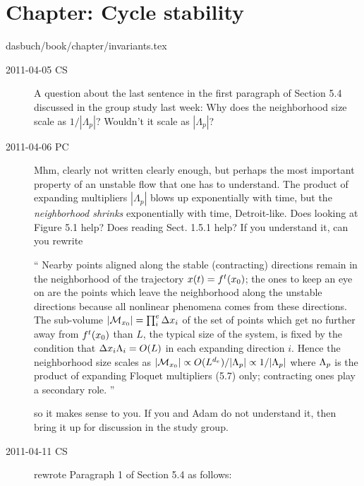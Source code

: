\section{Chapter: Cycle stability}
\label{c-invariants}\noindent dasbuch/book/chapter/invariants.tex
\begin{description}

\item[2011-04-05 CS] A question about the last sentence in the first
paragraph of Section 5.4  discussed in the group study last week: Why
does the neighborhood size scale as $1/|\Lambda_{p}|$? Wouldn't it scale
as $|\Lambda_{p}|$?

\item[2011-04-06 PC] Mhm, clearly not written clearly enough, but perhaps
the most important property of an unstable flow that one has to
understand. The product of expanding multipliers $|\Lambda_{p}|$ blows up
exponentially with time, but the \emph{neighborhood shrinks}
exponentially with time, Detroit-like. Does looking at Figure 5.1 help?
Does reading Sect. 1.5.1 help? If you understand it, can you rewrite

                                                    \toCB
``
Nearby points aligned along the stable (contracting) directions  remain
in the neighborhood of the trajectory $x(t)= {f^{t}({x_0})}$; the
ones to keep an eye on are the points which leave the neighborhood along
the unstable directions because all nonlinear phenomena comes from these
directions. The sub-volume $ |{\cal M}_{{x_0}}| = \prod_i^e\Delta x_i$ of
the set of points which get no further away from ${f^{t}({x_0})}$ than
$L$, the typical size of the system, is fixed by the condition that
$\Delta x_i \Lambda_i = O(L)$ in each expanding direction $i$. Hence
the neighborhood size scales as $|{\cal M}_{{x_0}}| \propto
O(L^{d_e})/|\Lambda_p| \propto 1/|\Lambda_p| $ where $\Lambda_p$ is
the product of expanding Floquet multipliers
(5.7) %
only; contracting ones play a secondary role.
''

so it makes sense to you. If you and Adam do not understand it, then
bring it up for discussion in the study group.

\item[2011-04-11 CS]
rewrote Paragraph 1 of Section 5.4 as follows:



\end{description}
